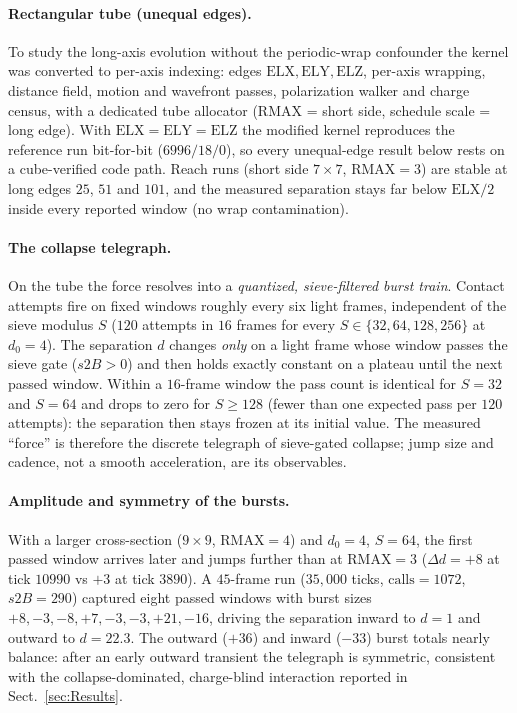 \documentclass{ijuc}
\begin{document}
\paragraph{Rectangular tube (unequal edges).} To study the long-axis
evolution without the periodic-wrap confounder the kernel was converted to
per-axis indexing: edges $\mathrm{ELX},\mathrm{ELY},\mathrm{ELZ}$, per-axis
wrapping, distance field, motion and wavefront passes, polarization walker
and charge census, with a dedicated tube allocator ($\mathrm{RMAX}$ = short
side, schedule scale = long edge).  With $\mathrm{ELX}=\mathrm{ELY}
=\mathrm{ELZ}$ the modified kernel reproduces the reference run
bit-for-bit ($6996/18/0$), so every unequal-edge result below rests on a
cube-verified code path.  Reach runs (short side $7\times7$,
$\mathrm{RMAX}=3$) are stable at long edges $25$, $51$ and $101$, and the
measured separation stays far below $\mathrm{ELX}/2$ inside every reported
window (no wrap contamination).

\paragraph{The collapse telegraph.} On the tube the force resolves into a
\emph{quantized, sieve-filtered burst train}.  Contact attempts fire on
fixed windows roughly every six light frames, independent of the sieve
modulus $S$ ($120$ attempts in $16$ frames for every $S\in\{32,64,128,256\}$
at $d_0=4$).  The separation $d$ changes \emph{only} on a light frame whose
window passes the sieve gate ($s2B>0$) and then holds exactly constant on a
plateau until the next passed window.  Within a $16$-frame window the pass
count is identical for $S=32$ and $S=64$ and drops to zero for $S\ge128$
(fewer than one expected pass per $120$ attempts): the separation then stays
frozen at its initial value.  The measured ``force'' is therefore the
discrete telegraph of sieve-gated collapse; jump size and cadence, not a
smooth acceleration, are its observables.

\paragraph{Amplitude and symmetry of the bursts.} With a larger cross-section
($9\times9$, $\mathrm{RMAX}=4$) and $d_0=4$, $S=64$, the first passed window
arrives later and jumps further than at $\mathrm{RMAX}=3$ ($\Delta d=+8$ at
tick $10990$ vs $+3$ at tick $3890$).  A $45$-frame run ($35{,}000$ ticks,
$\mathrm{calls}=1072$, $s2B=290$) captured eight passed windows with burst
sizes $+8,-3,-8,+7,-3,-3,+21,-16$, driving the separation inward to $d=1$
and outward to $d=22.3$.  The outward ($+36$) and inward ($-33$) burst
totals nearly balance: after an early outward transient the telegraph is
symmetric, consistent with the collapse-dominated, charge-blind interaction
reported in Sect.~\ref{sec:Results}.
\end{document}
